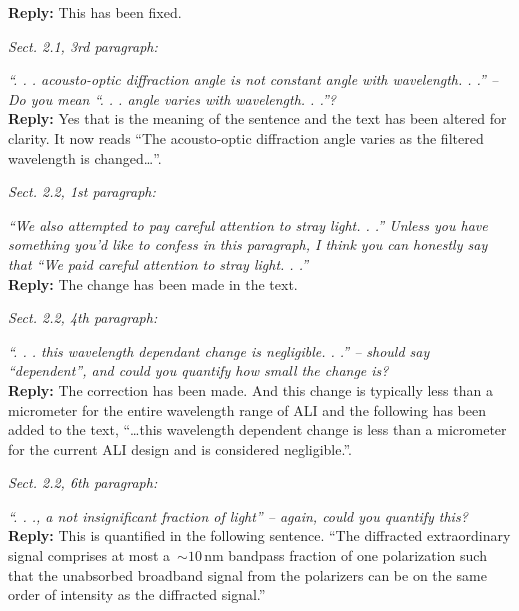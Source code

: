 \documentclass[12pt, notitlepage]{article}
\begin{document}
\textbf{Reply:} This has been fixed.

\hrulefill

\textit{Sect. 2.1, 3rd paragraph:}

\textit{``. . . acousto-optic diffraction angle is not constant angle with wavelength. . .'' – Do you
mean ``. . . angle varies with wavelength. . .''?}\\

\textbf{Reply:} Yes that is the meaning of the sentence and the text has been altered for clarity. It now reads ``The acousto-optic diffraction angle varies as the filtered wavelength is changed\ldots''.

\hrulefill

\textit{Sect. 2.2, 1st paragraph:}

\textit{``We also attempted to pay careful attention to stray light. . .'' Unless you have something
you'd like to confess in this paragraph, I think you can honestly say that ``We paid careful
attention to stray light. . .''}\\

\textbf{Reply:} The change has been made in the text.

\hrulefill

\textit{Sect. 2.2, 4th paragraph:}

\textit{``. . . this wavelength dependant change is negligible. . .'' – should say ``dependent'', and
could you quantify how small the change is?}\\

\textbf{Reply:} The correction has been made. And this change is typically less than a micrometer for the entire wavelength range of ALI and the following has been added to the text, ``\ldots this wavelength dependent change is less than a micrometer for the current ALI design and is considered negligible.''.

\hrulefill

\textit{Sect. 2.2, 6th paragraph:}

\textit{``. . ., a not insignificant fraction of light'' – again, could you quantify this?}\\

\textbf{Reply:} This is quantified in the following sentence. ``The diffracted extraordinary signal comprises at
most a~$\sim 10$\,nm bandpass fraction of one polarization such
that the unabsorbed broadband signal from the polarizers can be on the
same order of intensity as the diffracted signal.''

\hrulefill
\end{document}
